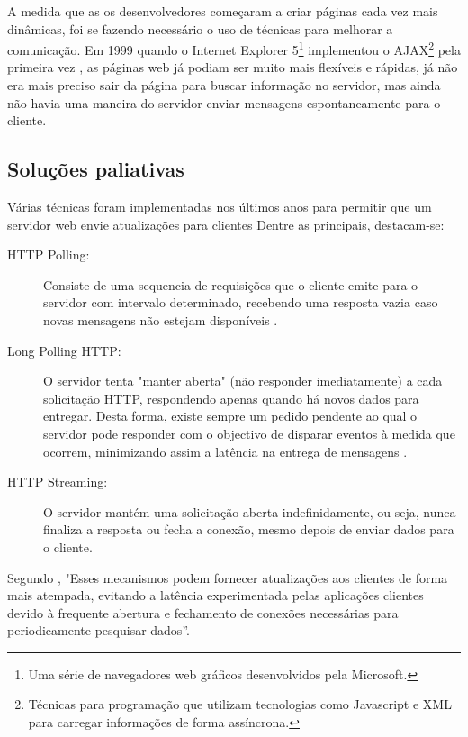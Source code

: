 A medida que as os desenvolvedores começaram a criar páginas cada vez mais dinâmicas, foi se fazendo necessário o uso de técnicas para melhorar a comunicação. Em 1999 quando o Internet Explorer 5\footnote{Uma série de navegadores web gráficos desenvolvidos pela Microsoft.} implementou o AJAX\footnote{Técnicas para programação que utilizam tecnologias como Javascript e XML para carregar informações de forma assíncrona.} pela primeira vez \citep{Asleson2006}, as páginas web já podiam ser muito mais flexíveis e rápidas, já não era mais preciso sair da página para buscar informação no servidor, mas ainda não havia uma maneira do servidor enviar mensagens espontaneamente para o cliente.

\subsection{Soluções paliativas}

Várias técnicas foram implementadas nos últimos anos para permitir que um servidor web envie atualizações para clientes Dentre as principais, destacam-se:

\begin{description}
	\item[HTTP Polling:] Consiste de uma sequencia de requisições que o cliente emite para o servidor com intervalo determinado, recebendo uma resposta vazia caso novas mensagens não estejam disponíveis \citep{Pimentel2012}.
	
	\item[Long Polling HTTP:] O servidor tenta "manter aberta" (não responder imediatamente) a cada solicitação HTTP, respondendo apenas quando há novos dados para entregar. Desta forma, existe sempre um pedido pendente ao qual o servidor pode responder com o objectivo de disparar eventos à medida que ocorrem, minimizando assim a latência na entrega de mensagens \citep{Aghaei2012}.

	\item[HTTP Streaming:] O servidor mantém uma solicitação aberta indefinidamente, ou seja, nunca finaliza a resposta ou fecha a conexão, mesmo depois de enviar dados para o cliente.
\end{description}

Segundo \citet[p.~3]{Loreto2011}, "Esses mecanismos podem fornecer atualizações aos clientes de forma mais atempada, evitando a latência experimentada pelas aplicações clientes devido à frequente abertura e fechamento de conexões necessárias para periodicamente pesquisar dados”.

